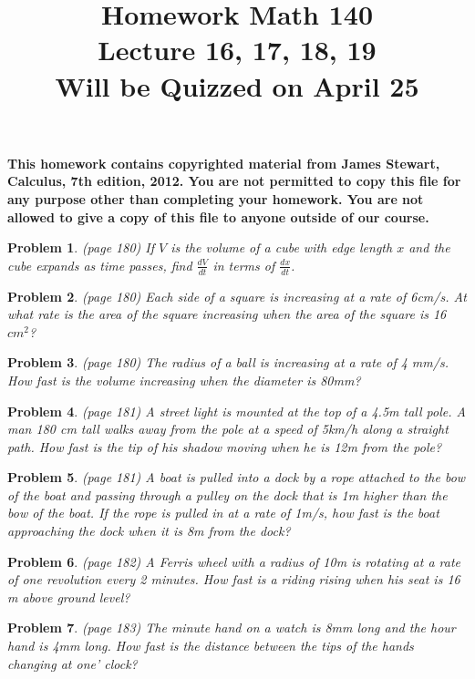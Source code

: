 \documentclass{article}
\date{}
\title{
Homework Math 140 \\
Lecture 16, 17, 18, 19 \\
Will be Quizzed on April 25
}
\newtheorem{problem}{Problem}
\begin{document}
\maketitle
\textbf{This homework contains copyrighted material from  James Stewart, Calculus, 7th edition, 2012. 
You are not permitted to copy this file for any purpose other than completing your homework. You are not allowed to give a copy of this file to anyone outside of our course. 
}

\begin{problem} (page 180)
If $V$ is the volume of a cube with edge length $x$ and the cube expands as time passes, find $\frac{dV}{dt}$ in terms of $\frac{dx}{dt}$.
\end{problem}
\begin{problem} (page 180)
Each side of a square is increasing at a rate of 6cm/s. At what rate is the area of the square increasing when the area of the square is 16 $cm^2$?
\end{problem}
\begin{problem}(page 180)
The radius of a ball is increasing at a rate of 4 mm/s. How fast is the volume increasing when the diameter is 80mm?
\end{problem}
\begin{problem}(page 181)
A street light is mounted at the top of a 4.5m tall pole. A man 180 cm tall walks away from the pole at a speed of 5km/h along a straight path. How fast is the tip of his shadow moving when he is 12m from the pole?
\end{problem}
\begin{problem}(page 181)
A boat is pulled into a dock by a rope attached to the bow of the boat and passing through a pulley on the dock that is 1m higher than the bow of the boat. If the rope is pulled in at a rate of 1m/s, how fast is the boat approaching the dock when it is 8m from the dock?
\end{problem}
\begin{problem}(page 182)
A Ferris wheel with a radius of 10m is rotating at a rate of one revolution every 2 minutes. How fast is a riding rising when his seat is 16 m above ground level?
\end{problem}
\begin{problem}(page 183)
The minute hand on a watch is 8mm long and the hour hand is 4mm long. How fast is the distance between the tips of the hands changing at one' clock?
\end{problem}
\end{document}

